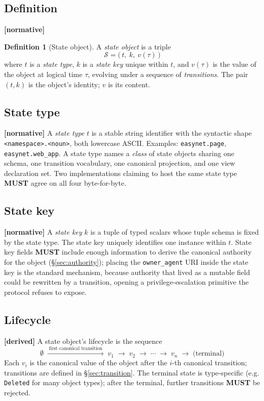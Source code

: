 \documentclass[11pt,a4paper]{article}
\newcommand{\normsv}{\textcolor{normativecolor}{\textbf{[normative]}}\xspace}
\newcommand{\derived}{\textcolor{derivedcolor}{\textbf{[derived]}}\xspace}
\theoremstyle{definition}
\newtheorem{definition}{Definition}
\begin{document}
\subsection{Definition}

\normsv{}
\begin{definition}[State object]
A \emph{state object} is a triple
\[
    \mathcal{S} = \bigl(\,t,\ k,\ v(\tau)\,\bigr)
\]
where $t$ is a \emph{state type}, $k$ is a \emph{state key} unique
within $t$, and $v(\tau)$ is the value of the object at logical time
$\tau$, evolving under a sequence of \emph{transitions}. The pair
$(t,k)$ is the object's identity; $v$ is its content.
\end{definition}

\subsection{State type}
\label{sec:state-type}

\normsv{}
A \emph{state type} $t$ is a stable string identifier with the
syntactic shape \texttt{<namespace>.<noun>}, both lowercase ASCII.
Examples: \texttt{easynet.page}, \texttt{easynet.web\_app}.
A state type names a \emph{class} of state objects sharing one
schema, one transition vocabulary, one canonical projection, and
one view declaration set. Two implementations claiming to host the
same state type \textbf{MUST} agree on all four byte-for-byte.

\subsection{State key}
\label{sec:state-key}

\normsv{}
A \emph{state key} $k$ is a tuple of typed scalars whose tuple
schema is fixed by the state type. The state key uniquely
identifies one instance within $t$. State key fields \textbf{MUST}
include enough information to derive the canonical authority for
the object (\S\ref{sec:authority}); placing the
\texttt{owner\_agent} URI inside the state key is the standard
mechanism, because authority that lived as a mutable field could
be rewritten by a transition, opening a privilege-escalation
primitive the protocol refuses to expose.

\subsection{Lifecycle}

\derived{} A state object's lifecycle is the sequence
\[
    \emptyset \;\xrightarrow{\;\text{first canonical transition}\;}\; v_1
    \;\to\; v_2 \;\to\; \cdots \;\to\; v_n \;\to\; \text{(terminal)}
\]
Each $v_i$ is the canonical value of the object after the
$i$-th canonical transition; transitions are defined in
\S\ref{sec:transition}. The terminal state is type-specific (e.g.
\texttt{Deleted} for many object types); after the terminal,
further transitions \textbf{MUST} be rejected.
\end{document}
